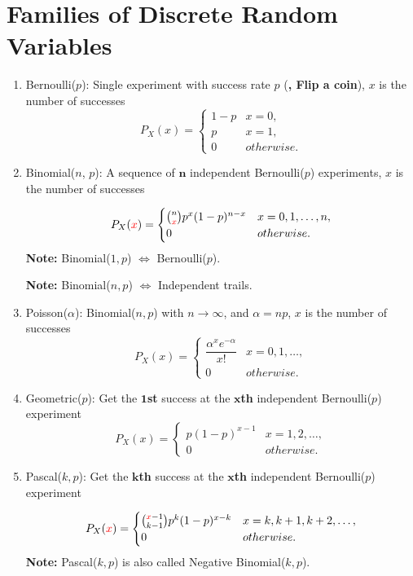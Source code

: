 \section{Families of Discrete Random Variables}
\begin{enumerate}
    \item Bernoulli($p$): Single experiment with success rate $p$ (\textbf{\ie, Flip a coin}), $x$ is the number of successes{
        \[ P_X(x) =
        \begin{cases}
            1-p & x=0, \\
            p   & x=1, \\
            0   & otherwise.
        \end{cases} \]
    }
    \item Binomial($n$, $p$): A sequence of $\mathbf{n}$ independent Bernoulli($p$) experiments, $x$ is the number of successes{
        \[P_X(\textcolor{red}{x}) = {
            \begin{cases}
                \binom{n}{\textcolor{red}{x}}p^x(1-p)^{n-x} & x=0,1,\ldots,n, \\
                0 & otherwise.
            \end{cases}
        }\]
        \textbf{Note:} Binomial($1, p$) $\iff$ Bernoulli($p$).

        \textbf{Note:} Binomial($n, p$) $\iff$ Independent trails.
    }
    \item Poisson($\alpha$): Binomial($n, p$) with $n\rightarrow\infty$, and $\alpha=np$, $x$ is the number of successes{
        \[ P_X(x) =
        \begin{cases}
            \dfrac{\alpha^x e^{-\alpha}}{x!}   & x=0,1,\ldots, \\
            0   & otherwise.
        \end{cases} \]
    }
    \item Geometric($p$): Get the $\bm{1}$\textbf{st} success at the $\bm{x}$\textbf{th} independent Bernoulli($p$) experiment {
        \[ P_X(x) =
        \begin{cases}
            p(1-p)^{x-1} & x=1,2,\ldots, \\
            0   & otherwise.
        \end{cases} \]
    }
    \item Pascal($k,p$): Get the $\bm{k}$\textbf{th} success at the $\bm{x}$\textbf{th} independent Bernoulli($p$) experiment {
        \[P_X(\textcolor{red}{x}) = {
            \begin{cases}
                \binom{\textcolor{red}{x}-1}{k-1}p^k(1-p)^{x-k} & x=k,k+1,k+2,\ldots, \\
                0 & otherwise.
            \end{cases}
        }\]
        \textbf{Note:} Pascal($k,p$) is also called Negative Binomial($k,p$).

}
\end{enumerate}
